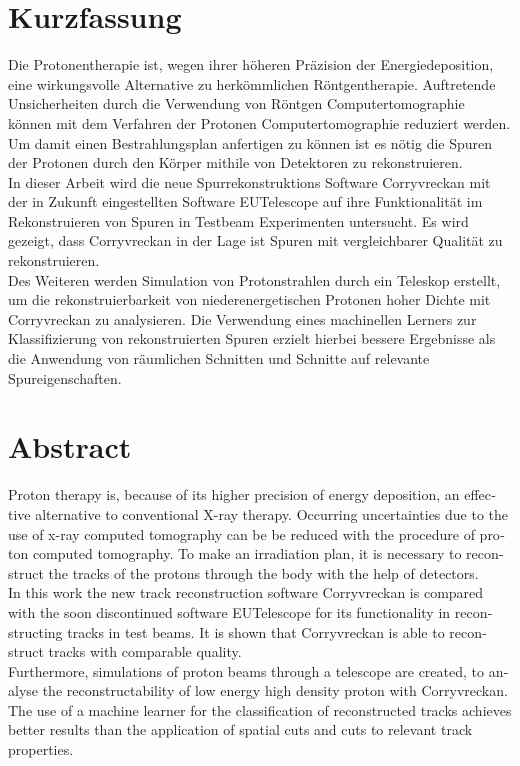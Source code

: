 \thispagestyle{plain}

\section*{Kurzfassung}
Die Protonentherapie ist, wegen ihrer höheren Präzision der Energiedeposition, eine wirkungsvolle Alternative zu herkömmlichen Röntgentherapie.
Auftretende Unsicherheiten durch die Verwendung von Röntgen Computertomographie können mit dem Verfahren der Protonen Computertomographie reduziert werden.
Um damit einen Bestrahlungsplan anfertigen zu können ist es nötig die Spuren der Protonen durch den Körper mithile von Detektoren zu rekonstruieren. \\
In dieser Arbeit wird die neue Spurrekonstruktions Software Corryvreckan mit der in Zukunft eingestellten Software EUTelescope auf ihre Funktionalität im
Rekonstruieren von Spuren in Testbeam Experimenten untersucht. Es wird gezeigt, dass Corryvreckan in der Lage ist Spuren mit vergleichbarer Qualität zu rekonstruieren.\\
Des Weiteren werden Simulation von Protonstrahlen durch ein Teleskop erstellt, um die rekonstruierbarkeit von niederenergetischen Protonen hoher Dichte
mit Corryvreckan zu analysieren. Die Verwendung eines machinellen Lerners zur Klassifizierung von rekonstruierten Spuren
erzielt hierbei bessere Ergebnisse als die Anwendung von räumlichen Schnitten und Schnitte auf relevante Spureigenschaften.

\section*{Abstract}
\begin{english}
Proton therapy is, because of its higher precision of energy deposition,
an effective alternative to conventional X-ray therapy. Occurring
uncertainties due to the use of x-ray computed tomography can be
be reduced with the procedure of proton computed tomography. To
make an irradiation plan, it is necessary to reconstruct the tracks of the protons
through the body with the help of detectors. \\
In this work the new track reconstruction software Corryvreckan is compared with the soon discontinued
software EUTelescope for its functionality in reconstructing tracks in test beams. 
It is shown that
Corryvreckan is able to reconstruct tracks with comparable quality. \\
Furthermore, simulations of proton beams through a telescope are created,
to analyse the reconstructability of low energy high density proton with Corryvreckan. The use of a machine learner for the
classification of reconstructed tracks achieves better results than the application of spatial cuts and cuts to relevant track properties.


\end{english}
